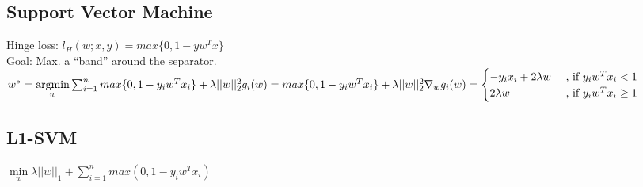 \subsection*{Support Vector Machine}
Hinge loss: $l_H(w;x,y) = max \{0,1-y w^T x\}$\\
Goal: Max. a ``band'' around the separator.\\
$w^* = \underset{w}{\operatorname{argmin}} \sum_{i=1}^n  max \{0,1-y_i w^T x_i\} + \lambda ||w||_2^2\\
g_i(w) = max \{0,1-y_i w^T x_i\} + \lambda ||w||_2^2\\
\nabla_w g_i(w) = \begin{cases}
    -y_i x_i + 2\lambda w &\text{ , if $y_i w^T x_i<1$}\\
		2\lambda w &\text{ , if $y_i w^T x_i \geq 1$}
\end{cases}$

\subsection*{L1-SVM}
$\underset{w}{\operatorname{min}} \lambda ||w||_1 + \sum_{i=1}^n max(0,1-y_i w^T x_i)$

